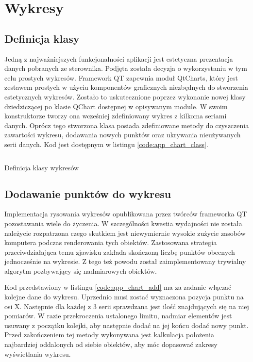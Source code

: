 \section{Wykresy}
    \subsection{Definicja klasy}
        Jedną z najważniejszych funkcjonalności aplikacji jest estetyczna prezentacja danych pobranych ze sterownika. Podjęta została decyzja o wykorzystaniu w tym celu prostych wykresów. Framework QT zapewnia moduł QtCharts, który jest zestawem prostych w użyciu komponentów graficznych niezbędnych do stworzenia estetycznych wykresów. Zostało to uskutecznione poprzez wykonanie nowej klasy dziedziczącej po klasie QChart dostępnej w opisywanym module. W swoim konstruktorze tworzy ona wcześniej zdefiniowany wykres z kilkoma seriami danych. Oprócz tego stworzona klasa posiada zdefiniowane metody do czyszczenia zawartości wykresu, dodawania nowych punktów oraz ukrywania nieużywanych serii danych. Kod jest dostępnym w listingu \ref{code:app_chart_class}.
   
        \begin{kod}
          \inputminted[firstline=17]{cpp}{app/listings/chart.hpp}
          \caption{Definicja klasy wykresów}
          \label{code:app_chart_class}
        \end{kod}     
        
    \subsection{Dodawanie punktów do wykresu}
        Implementacja rysowania wykresów opublikowana przez twórców frameworka QT pozostawania wiele do życzenia. W szczególności kwestia wydajności nie została należycie rozpatrzona czego skutkiem jest niewymiernie wysokie zużycie zasobów komputera podczas renderowania tych obiektów. Zastosowana strategia przeciwdziałająca temu zjawisku zakłada skończoną liczbę punktów obecnych jednocześnie na wykresie. Z tego też powodu został zaimplementowany trywialny algorytm pozbywający się nadmiarowych obiektów. 
        
        Kod przedstawiony w listingu \ref{code:app_chart_add} ma za zadanie włączać kolejne dane do wykresu. Uprzednio musi zostać wyznaczona pozycja punktu na osi X. Następnie dla każdej z 3 serii sprawdzana jest ilość znajdujących się na niej pomiarów. W razie przekroczenia ustalonego limitu, nadmiar elementów jest usuwany z początku kolejki, aby następnie dodać na jej końcu dodać nowy punkt. Przed zakończeniem tej metody wykonywana jest kalkulacja położenia najbardziej oddalonych od siebie obiektów, aby móc dopasować zakresy wyświetlania wykresu.
        
